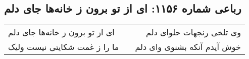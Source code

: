 \begin{center}
\section*{رباعی شماره ۱۱۵۶: ای از تو برون ز خانه‌ها جای دلم}
\label{sec:1156}
\begin{longtable}{l p{0.5cm} r}
ای از تو برون ز خانه‌ها جای دلم
&&
وی تلخی رنجهات حلوای دلم
\\
ما را ز غمت شکایتی نیست ولیک
&&
خوش آیدم آنکه بشنوی وای دلم
\\
\end{longtable}
\end{center}
